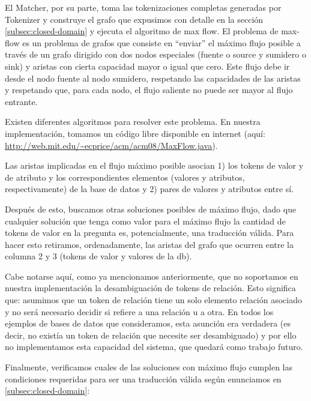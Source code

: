 El Matcher, por su parte, toma las tokenizaciones completas generadas por Tokenizer y construye el grafo que expusimos con detalle en la sección \ref{subsec:closed-domain} y ejecuta el algoritmo de max flow. El problema de max-flow es un problema de grafos que consiste en “enviar” el máximo flujo posible a través de un grafo dirigido con dos nodos especiales (fuente o source y sumidero o sink) y aristas con cierta capacidad mayor o igual que cero. Este flujo debe ir desde el nodo fuente al nodo sumidero, respetando las capacidades de las aristas y respetando que, para cada nodo, el flujo saliente no puede ser mayor al flujo entrante.

Existen diferentes algoritmos para resolver este problema. En nuestra implementación, tomamos un código libre disponible en internet (aquí: \url{http://web.mit.edu/~ecprice/acm/acm08/MaxFlow.java}).

Las aristas implicadas en el flujo máximo posible asocian 1) los tokens de valor y de atributo y los correspondientes elementos (valores y atributos, respectivamente) de la base de datos y 2) pares de valores y atributos entre sí.

Después de esto, buscamos otras soluciones posibles de máximo flujo, dado que cualquier solución que tenga como valor para el máximo flujo la cantidad de tokens de valor en la pregunta es, potencialmente, una traducción válida. Para hacer esto retiramos, ordenadamente, las aristas del grafo que ocurren entre la columna 2 y 3 (tokens de valor y valores de la db).

Cabe notarse aquí, como ya mencionamos anteriormente, que no soportamos en nuestra implementación la desambiguación de tokens de relación. Esto significa que: asumimos que un token de relación tiene un solo elemento relación asociado y no será necesario decidir si refiere a una relación u a otra. En todos los ejemplos de bases de datos que consideramos, esta asunción era verdadera (es decir, no existía un token de relación que necesite ser desambiguado) y por ello no implementamos esta capacidad del sistema, que quedará como trabajo futuro.

\medskip

Finalmente, verificamos cuales de las soluciones con máximo flujo cumplen las condiciones requeridas para ser una traducción válida según enunciamos en \ref{subsec:closed-domain}:

